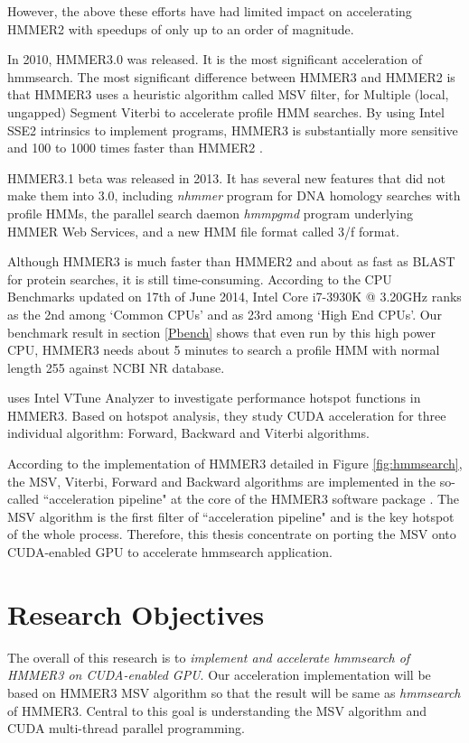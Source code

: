However, the above these efforts have had limited impact on accelerating HMMER2 with speedups of only up to an order of magnitude.

In 2010, HMMER3.0 was released. It is the most significant acceleration of hmmsearch. The most significant difference between HMMER3 and HMMER2 is that HMMER3 uses a heuristic algorithm called MSV filter, for Multiple (local, ungapped) Segment Viterbi to accelerate profile HMM searches. By using Intel SSE2 intrinsics to implement programs, HMMER3 is substantially more sensitive and 100 to 1000 times faster than HMMER2 \citep{HMMER3}.

HMMER3.1 beta was released in 2013. It has several new features that did not make them into 3.0, including \emph{nhmmer} program for DNA homology searches with profile HMMs, the parallel search daemon \emph{hmmpgmd} program underlying HMMER Web Services, and a new HMM file format called 3/f format.

Although HMMER3 is much faster than HMMER2 and about as fast as BLAST for protein searches, it is still time-consuming. According to the CPU Benchmarks \citep{cpus} updated on 17th of June 2014, Intel Core i7-3930K @ 3.20GHz ranks as the 2nd among `Common CPUs' and as 23rd among `High End CPUs'. Our benchmark result in section \ref{Pbench} shows that even run by this high power CPU, HMMER3 needs about 5 minutes to search a profile HMM with normal length 255 against NCBI NR database.

\citep{Ahmed} uses Intel VTune Analyzer \citep{Intel} to investigate performance hotspot functions in HMMER3. Based on hotspot analysis, they study CUDA acceleration for three individual algorithm: Forward, Backward and Viterbi algorithms.

According to the implementation of HMMER3 detailed in Figure \ref{fig:hmmsearch}, the MSV, Viterbi, Forward and Backward algorithms are implemented in the so-called ``acceleration pipeline" at the core of the HMMER3 software package \citep{HMMER3}. The MSV algorithm is the first filter of ``acceleration pipeline" and is the key hotspot of the whole process. Therefore, this thesis concentrate on porting the MSV onto CUDA-enabled GPU to accelerate hmmsearch application.

\section{Research Objectives}
The overall of this research is to \emph{implement and accelerate hmmsearch of HMMER3 on CUDA-enabled GPU}. Our acceleration implementation will be based on HMMER3 MSV algorithm so that the result will be same as \emph{hmmsearch} of HMMER3. Central to this goal is understanding the MSV algorithm and CUDA multi-thread parallel programming. 

